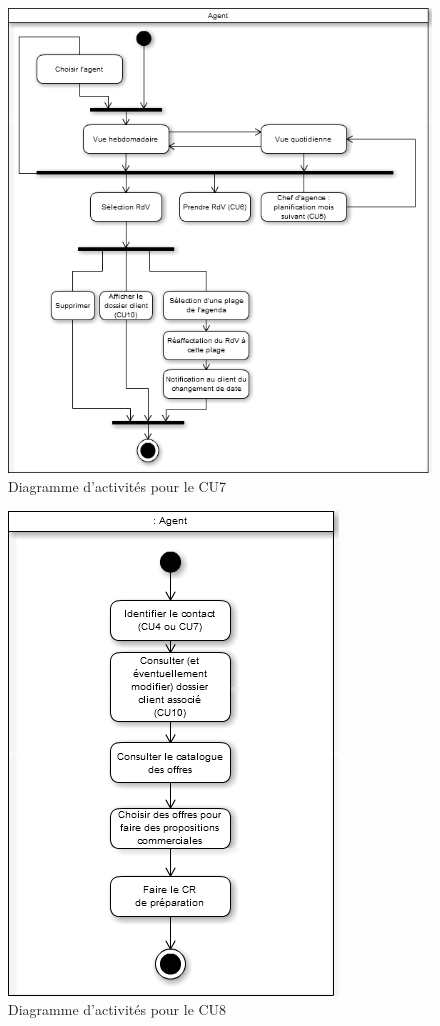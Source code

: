 \begin{figure}[H]
	\begin{center}
		\includegraphics[scale=0.4]{Includes/SOA-Activite-CU7.png}
		\caption{Diagramme d'activités pour le CU7}
	\end{center}
\end{figure}

\begin{figure}[H]
	\begin{center}
		\includegraphics[scale=0.4]{Includes/SOA-Activite-CU8.png}
		\caption{Diagramme d'activités pour le CU8}
	\end{center}
\end{figure}

